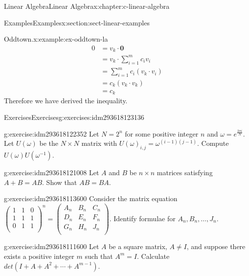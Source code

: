 \documentclass[twoside,10pt,]{book}
\numberwithin{equation}{section}
\renewcommand{\vec}[1]{\mathbf{#1}}
\begin{document}
\begin{chapterptx}{Linear Algebra}{}{Linear Algebra}{}{}{x:chapter:c-linear-algebra}
\begin{sectionptx}{Examples}{}{Examples}{}{}{x:section:sect-linear-examples}
\begin{example}{Oddtown.}{x:example:ex-oddtown-la}
\begin{equation*}
\begin{split}
0 & = v_k \cdot \vec{0}\\
& = v_k \cdot \sum_{i=1}^m c_i v_i\\
& = \sum_{i=1}^m c_i (v_k \cdot v_i)\\
& = c_k (v_k \cdot v_k)\\
& = c_k
\end{split}
\end{equation*}
Therefore we have derived the inequality.%
\end{example}
\end{sectionptx}
%
%
\typeout{************************************************}
\typeout{************************************************}
%
\begin{exercises-section}{Exercises}{}{Exercises}{}{}{g:exercises:idm293618123136}
\begin{divisionexercise}{1}{}{}{g:exercise:idm293618122352}%
Let \(N=2^n\) for some positive integer \(n\) and \(\omega =e^{\frac{2\pi i}{N}}\).  Let \(U(\omega )\) be the \(N\times N\) matrix with \(U(\omega)_{i,j}= \omega^{(i-1)(j-1)}\).  Compute \(U(\omega )U\left(\omega ^{-1}\right)\).%
\end{divisionexercise}%
\begin{divisionexercise}{2}{}{}{g:exercise:idm293618121008}%
Let \(A\) and \(B\) be \(n\times n\) matrices satisfying \(A+B = A B\). Show that \(A B = B A\).%
\end{divisionexercise}%
\begin{divisionexercise}{3}{}{}{g:exercise:idm293618113600}%
Consider the matrix equation \(\left(
\begin{array}{ccc}
1 & 1 & 0 \\
1 & 1 & 1 \\
0 & 1 & 1 \\
\end{array}
\right)^n=\left(
\begin{array}{ccc}
A_n & B_n & C_n \\
D_n & E_n & F_n \\
G_n & H_n & J_n \\
\end{array}
\right)\).  Identify formulae for \(A_n, B_n,\ldots , J_n\).%
\end{divisionexercise}%
\begin{divisionexercise}{4}{}{}{g:exercise:idm293618111600}%
Let \(A\) be a square matrix, \(A \neq I\), and suppose there exists a positive integer \(m\) such that \(A^m=I\).  Calculate \(det(I + A + A^2 + \cdots + A^{m-1})\).%

\end{divisionexercise}
\end{exercises-section}
\end{chapterptx}
\end{document}
